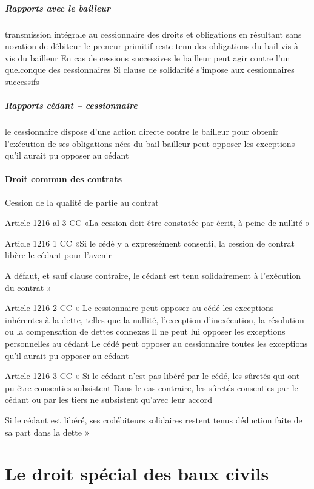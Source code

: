\documentclass[10pt,a4paper,twoside]{article}
\begin{document}
				\subparagraph{Rapports avec le bailleur}
					transmission intégrale au cessionnaire
					des droits et obligations en résultant sans novation de débiteur
					le preneur primitif reste tenu des obligations du bail vis à vis du
					bailleur
					En
					cas de cessions successives le bailleur peut agir contre l’un
					quelconque des cessionnaires Si clause de solidarité s’impose
					aux cessionnaires successifs

				\subparagraph{Rapports cédant -- cessionnaire}
					le cessionnaire dispose d’une
					action directe contre le bailleur pour obtenir l’exécution de ses
					obligations nées du bail bailleur peut opposer les exceptions
					qu’il aurait pu opposer au cédant

			\paragraph{Droit commun des contrats}

				Cession de la qualité de partie au contrat

				Article 1216 al 3 CC «La cession doit être constatée par
				écrit, à peine de nullité »

				Article 1216 1 CC «Si le cédé y a expressément consenti, la
				cession de contrat libère le cédant pour l'avenir

				A défaut, et sauf clause contraire, le cédant est tenu
				solidairement à l'exécution du contrat »

				Article 1216 2 CC « Le cessionnaire peut opposer au cédé les
				exceptions inhérentes à la dette, telles que la nullité, l'exception
				d'inexécution, la résolution ou la compensation de dettes connexes Il
				ne peut lui opposer les exceptions personnelles au cédant Le cédé
				peut opposer au cessionnaire toutes les exceptions qu'il aurait pu
				opposer au cédant

				Article 1216 3 CC « Si le cédant n'est pas libéré par le cédé, les
				sûretés qui ont pu être consenties subsistent Dans le cas contraire,
				les sûretés consenties par le cédant ou par les tiers ne subsistent
				qu'avec leur accord

				Si le cédant est libéré, ses codébiteurs solidaires restent tenus
				déduction faite de sa part dans la dette »

\section{Le droit spécial des baux civils}
\end{document}
